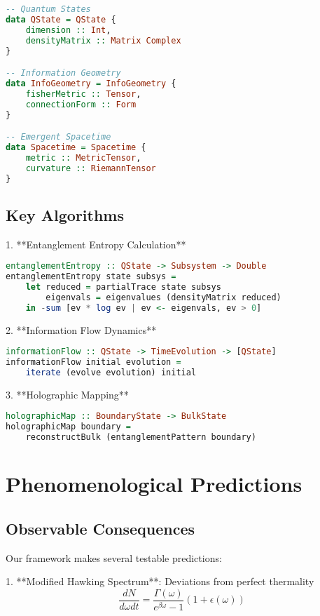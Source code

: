 \documentclass[12pt,a4paper]{article}
\begin{document}
\begin{lstlisting}[language=Haskell]
-- Quantum States
data QState = QState {
    dimension :: Int,
    densityMatrix :: Matrix Complex
}

-- Information Geometry
data InfoGeometry = InfoGeometry {
    fisherMetric :: Tensor,
    connectionForm :: Form
}

-- Emergent Spacetime
data Spacetime = Spacetime {
    metric :: MetricTensor,
    curvature :: RiemannTensor
}
\end{lstlisting}

\subsection{Key Algorithms}

1. **Entanglement Entropy Calculation**
\begin{lstlisting}[language=Haskell]
entanglementEntropy :: QState -> Subsystem -> Double
entanglementEntropy state subsys = 
    let reduced = partialTrace state subsys
        eigenvals = eigenvalues (densityMatrix reduced)
    in -sum [ev * log ev | ev <- eigenvals, ev > 0]
\end{lstlisting}

2. **Information Flow Dynamics**
\begin{lstlisting}[language=Haskell]
informationFlow :: QState -> TimeEvolution -> [QState]
informationFlow initial evolution = 
    iterate (evolve evolution) initial
\end{lstlisting}

3. **Holographic Mapping**
\begin{lstlisting}[language=Haskell]
holographicMap :: BoundaryState -> BulkState
holographicMap boundary = 
    reconstructBulk (entanglementPattern boundary)
\end{lstlisting}

\section{Phenomenological Predictions}

\subsection{Observable Consequences}

Our framework makes several testable predictions:

1. **Modified Hawking Spectrum**: Deviations from perfect thermality
\begin{equation}
\frac{dN}{d\omega dt} = \frac{\Gamma(\omega)}{e^{\beta\omega} - 1} \left(1 + \epsilon(\omega)\right)
\end{equation}
\end{document}
